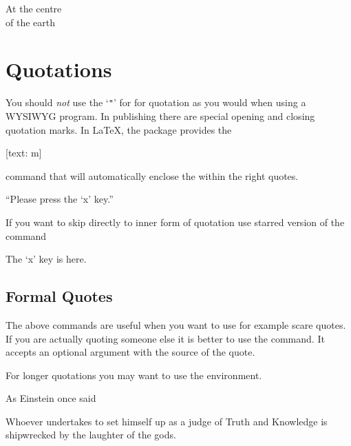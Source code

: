 \begin{example}
\begin{Center}
  At the centre\\of the earth
\end{Center}
\end{example}

\section{Quotations}\label{sec:csquotes}

You should \emph{not} use the \enquote*{\texttt{"}} for %
 for quotation as you would when
using a WYSIWYG program.  In publishing there are special opening and closing
quotation marks. In \LaTeX{}, the  package provides the
\begin{lscommand}
  [text: m]
\end{lscommand}
command that will automatically enclose the  within the right
quotes.
\begin{example}
\enquote{Please press
  the \enquote{x} key.}
\end{example}

If you want to skip directly to inner form of quotation use starred version of
the command
\begin{example}
The \enquote*{x} key is here.
\end{example}

\subsection{Formal Quotes}

The above commands are useful when you want to use for example scare quotes. If
you are actually quoting someone else it is better to use the 
command. It accepts an optional argument with the source of the quote.
\begin{example}
\end{example}

For longer quotations you may want to use the  environment.
\begin{example}[examplewidth=0.5\linewidth]
As Einstein once said
\begin{displayquote}
  Whoever undertakes to
  set himself up as a judge
  of Truth and Knowledge is
  shipwrecked by the laughter
  of the gods.
\end{displayquote}
\end{example}

